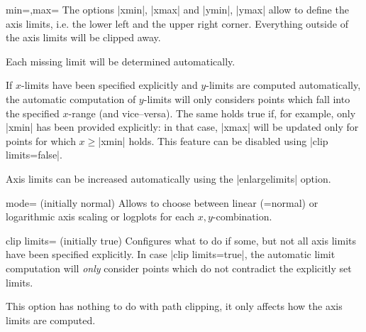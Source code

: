 \begin{pgfplotsxykeylist}{\x min=,\x max=}
The options |xmin|, |xmax| and |ymin|, |ymax| allow to define the axis limits, i.e. the lower left and the upper right corner. Everything outside of the axis limits will be clipped away.

Each missing limit will be determined automatically.

If $x$-limits have been specified explicitly and $y$-limits are computed automatically, the automatic computation of $y$-limits will only considers points which fall into the specified $x$-range (and vice--versa). The same holds true if, for example, only |xmin| has been provided explicitly: in that case, |xmax| will be updated only for points for which $x \ge $|xmin| holds. This feature can be disabled using |clip limits=false|. 

Axis limits can be increased automatically using the |enlargelimits| option.
\begin{codeexample}[]
\end{codeexample}

\begin{codeexample}[]
\end{codeexample}

\begin{codeexample}[]
\end{codeexample}
\end{pgfplotsxykeylist}

\begin{pgfplotsxykey}{\x mode= (initially normal)}
Allows to choose between linear (=normal) or logarithmic axis scaling or logplots for each $x,y$-combination.
\end{pgfplotsxykey}

\begin{pgfplotskey}{clip limits= (initially true)}
	Configures what to do if some, but not all axis limits have been specified explicitly. In case |clip limits=true|, the automatic limit computation will \emph{only} consider points which do not contradict the explicitly set limits. 

	This option has nothing to do with path clipping, it only affects how the axis limits are computed.
\end{pgfplotskey}

